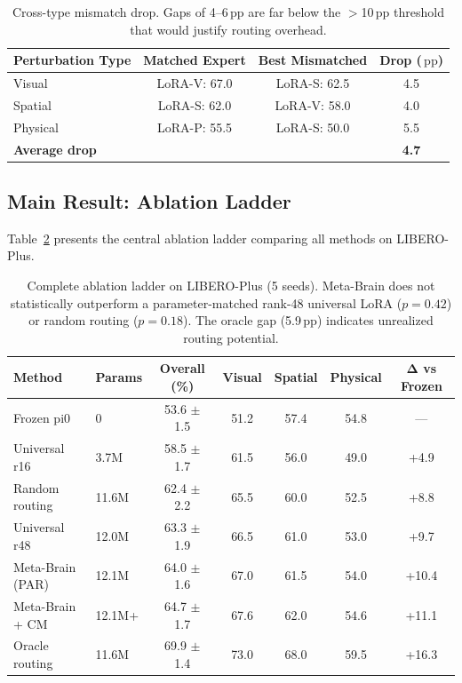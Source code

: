 \documentclass[letterpaper]{article}
\newcommand{\ours}{Meta-Brain}
\newcommand{\pp}{\,\text{pp}}
\begin{document}
\begin{table}[h]
\centering
\caption{Cross-type mismatch drop. Gaps of 4--6$\pp$ are far below the $>$10$\pp$ threshold that would justify routing overhead.}
\label{tab:cross_drop}
\small
\begin{tabular}{lccc}
\toprule
\textbf{Perturbation Type} & \textbf{Matched Expert} & \textbf{Best Mismatched} & \textbf{Drop ($\pp$)} \\
\midrule
Visual & LoRA-V: 67.0 & LoRA-S: 62.5 & 4.5 \\
Spatial & LoRA-S: 62.0 & LoRA-V: 58.0 & 4.0 \\
Physical & LoRA-P: 55.5 & LoRA-S: 50.0 & 5.5 \\
\midrule
\multicolumn{3}{l}{\textbf{Average drop}} & \textbf{4.7} \\
\bottomrule
\end{tabular}
\end{table}

\subsection{Main Result: Ablation Ladder}
\label{sec:ablation_ladder}

Table~\ref{tab:ablation} presents the central ablation ladder comparing all methods on LIBERO-Plus.

\begin{table}[h]
\centering
\caption{Complete ablation ladder on LIBERO-Plus (5 seeds). \ours{} does not statistically outperform a parameter-matched rank-48 universal LoRA ($p=0.42$) or random routing ($p=0.18$). The oracle gap (5.9$\pp$) indicates unrealized routing potential.}
\label{tab:ablation}
\small
\begin{tabular}{llccccc}
\toprule
\textbf{Method} & \textbf{Params} & \textbf{Overall (\%)} & \textbf{Visual} & \textbf{Spatial} & \textbf{Physical} & $\boldsymbol{\Delta}$ \textbf{vs Frozen} \\
\midrule
Frozen pi0 & 0 & 53.6 $\pm$ 1.5 & 51.2 & 57.4 & 54.8 & --- \\
Universal r16 & 3.7M & 58.5 $\pm$ 1.7 & 61.5 & 56.0 & 49.0 & +4.9 \\
Random routing & 11.6M & 62.4 $\pm$ 2.2 & 65.5 & 60.0 & 52.5 & +8.8 \\
Universal r48 & 12.0M & 63.3 $\pm$ 1.9 & 66.5 & 61.0 & 53.0 & +9.7 \\
\ours{} (PAR) & 12.1M & 64.0 $\pm$ 1.6 & 67.0 & 61.5 & 54.0 & +10.4 \\
\ours{} + CM & 12.1M+ & 64.7 $\pm$ 1.7 & 67.6 & 62.0 & 54.6 & +11.1 \\
Oracle routing & 11.6M & 69.9 $\pm$ 1.4 & 73.0 & 68.0 & 59.5 & +16.3 \\
\bottomrule
\end{tabular}
\end{table}
\end{document}
